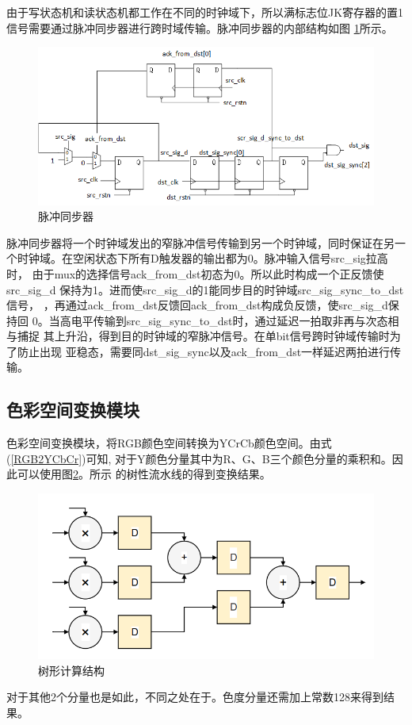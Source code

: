 \documentclass{article}
\numberwithin {equation}{section}
\begin{document}
\begin{spacing}{1.25}
      由于写状态机和读状态机都工作在不同的时钟域下，所以满标志位JK寄存器的置1
      信号需要通过脉冲同步器进行跨时域传输。脉冲同步器的内部结构如图
      \ref{pulse synchronizer}所示。
      \begin{figure}[H]
        \centering
        \includegraphics[scale=0.45]{./pictures/脉冲同步器.png}
        \caption{脉冲同步器}
        \label{pulse synchronizer}
      \end{figure}
      脉冲同步器将一个时钟域发出的窄脉冲信号传输到另一个时钟域，同时保证在另一
      个时钟域。在空闲状态下所有D触发器的输出都为0。脉冲输入信号src\_sig拉高时，
      由于mux的选择信号ack\_from\_dst初态为0。所以此时构成一个正反馈使src\_sig\_d
      保持为1。进而使src\_sig\_d的1能同步目的时钟域src\_sig\_sync\_to\_dst信号，
      ，再通过ack\_from\_dst反馈回ack\_from\_dst构成负反馈，使src\_sig\_d保持回
      0。当高电平传输到src\_sig\_sync\_to\_dst时，通过延迟一拍取非再与次态相与捕捉
      其上升沿，得到目的时钟域的窄脉冲信号。在单bit信号跨时钟域传输时为了防止出现
      亚稳态，需要同dst\_sig\_sync以及ack\_from\_dst一样延迟两拍进行传输。

  \subsection{色彩空间变换模块}
    色彩空间变换模块，将RGB颜色空间转换为YCrCb颜色空间。由式(\ref{RGB2YCbCr})可知,
    对于Y颜色分量其中为R、G、B三个颜色分量的乘积和。因此可以使用图\ref{tree}。所示
    的树性流水线的得到变换结果。
    \begin{figure}[H]
      \centering
      \includegraphics[scale=0.5]{./pictures/彩色空间转换模块.png}
      \caption{树形计算结构}
      \label{tree}
    \end{figure}
    对于其他2个分量也是如此，不同之处在于。色度分量还需加上常数128来得到结果。


\end{spacing}
\end{document}
